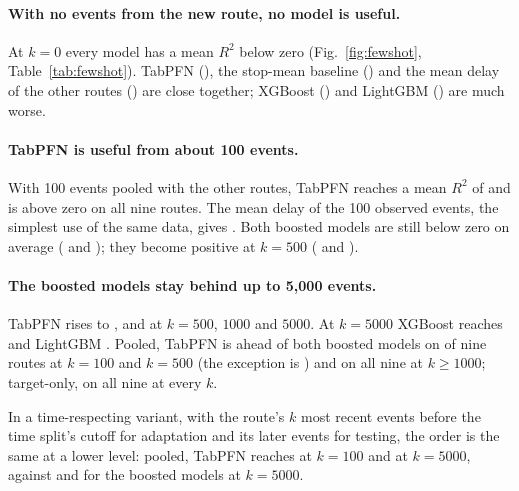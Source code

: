 \documentclass[runningheads]{llncs}
\begin{document}
\begin{table}[t]
\caption{Few-shot route experiment: mean $R^2$ on the new route over the nine
routes and three draws. $R^2$ is measured against the new route's own mean
delay on its test events.}
\label{tab:fewshot}
\centering
\small

\end{table}

\paragraph{With no events from the new route, no model is useful.}
At $k=0$ every model has a mean $R^2$ below zero (Fig.~\ref{fig:fewshot},
Table~\ref{tab:fewshot}). TabPFN (), the stop-mean
baseline () and the mean delay of the other
routes () are close together; XGBoost
() and LightGBM () are much
worse.

\paragraph{TabPFN is useful from about 100 events.}
With 100 events pooled with the other routes, TabPFN reaches a mean $R^2$ of
 and is above zero on all nine routes. The mean
delay of the 100 observed events, the simplest use of the same data, gives
. Both boosted models are still below zero on
average ( and ); they
become positive at $k=500$ ( and
).

\paragraph{The boosted models stay behind up to 5{,}000 events.}
TabPFN rises to ,  and
 at $k=500$, $1000$ and $5000$. At $k=5000$ XGBoost
reaches  and LightGBM . Pooled, TabPFN is ahead
of both boosted models on  of nine routes at $k=100$ and
$k=500$ (the exception is ) and on all nine at
$k \geq 1000$; target-only, on all nine at every $k$.

In a time-respecting variant, with the route's $k$ most recent events before
the time split's cutoff for adaptation and its later events for testing, the
order is the same at a lower level: pooled, TabPFN reaches
 at $k=100$ and  at
$k=5000$, against  and
 for the boosted models at $k=5000$.
\end{document}
